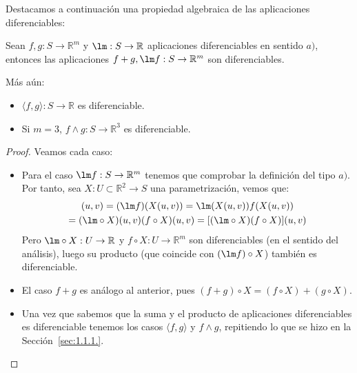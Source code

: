 \noindent
Destacamos a continuación una propiedad algebraica de las aplicaciones diferenciables:
\begin{prop}
    Sean $f,g:S\to \mathbb{R}^m$ y $\lm:S\to \mathbb{R}$ aplicaciones diferenciables en sentido $a)$, entonces las aplicaciones $f+g,\lm f:S\to \mathbb{R}^m$ son diferenciables.

    \noindent
    Más aún:
    \begin{itemize}
        \item $\langle f,g \rangle :S\to \mathbb{R}$ es diferenciable.
        \item Si $m=3$, $f\land g:S\to \mathbb{R}^3$ es diferenciable.
    \end{itemize}
    \begin{proof}
        Veamos cada caso:
        \begin{itemize}
            \item Para el caso $\lm f:S\to \mathbb{R}^m$ tenemos que comprobar la definición del tipo $a)$. Por tanto, sea $X:U\subset\mathbb{R}^2\to S$ una parametrización, vemos que:
                \begin{multline*}
                    [(\lm f)\circ X](u,v) = (\lm f)(X(u,v)) = \lm(X(u,v)) f(X(u,v)) \\ = (\lm\circ X)(u,v) (f\circ X)(u,v) = [(\lm\circ X)(f\circ X)](u,v)
                \end{multline*}
                Pero $\lm\circ X:U\to \mathbb{R}$ y $f\circ X:U\to \mathbb{R}^m$ son diferenciables (en el sentido del análisis), luego su producto (que coincide con $(\lm f)\circ X$) también es diferenciable.
            \item El caso $f+g$ es análogo al anterior, pues $(f+g)\circ X = (f\circ X)+(g\circ X)$.
            \item Una vez que sabemos que la suma y el producto de aplicaciones diferenciables es diferenciable tenemos los casos $\langle f,g \rangle $ y $f\land g$, repitiendo lo que se hizo en la Sección~\ref{sec:1.1.1.}.
        \end{itemize}
    \end{proof}
\end{prop}

